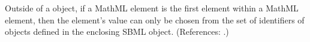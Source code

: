 Outside of a \FunctionDefinition object, if a MathML  element is
the first element within a MathML  element, then the
 element's value can only be chosen from the set of identifiers
of \FunctionDefinition{} objects defined in the enclosing SBML \Model
object.  (References: .)
